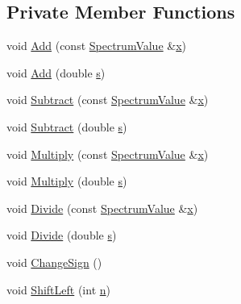 \subsection*{Private Member Functions}
\begin{DoxyCompactItemize}
\item 
void \hyperlink{classns3_1_1SpectrumValue_ae83185250a36c6f20ec48b81c6f37a8e}{Add} (const \hyperlink{classns3_1_1SpectrumValue}{Spectrum\+Value} \&\hyperlink{lte__link__budget__x2__handover__measures_8m_a9336ebf25087d91c818ee6e9ec29f8c1}{x})
\item 
void \hyperlink{classns3_1_1SpectrumValue_ac36e6799f96fe8fe49ffcc2446fa5e5a}{Add} (double \hyperlink{generate__test__data__lte__sinr_8m_ad83eeb3a142285d1243a08c6b7026df8}{s})
\item 
void \hyperlink{classns3_1_1SpectrumValue_a0b11c2d4e4ab5334c553c0ed629d4590}{Subtract} (const \hyperlink{classns3_1_1SpectrumValue}{Spectrum\+Value} \&\hyperlink{lte__link__budget__x2__handover__measures_8m_a9336ebf25087d91c818ee6e9ec29f8c1}{x})
\item 
void \hyperlink{classns3_1_1SpectrumValue_adb05d2e4648df697a996c62c9815e3b0}{Subtract} (double \hyperlink{generate__test__data__lte__sinr_8m_ad83eeb3a142285d1243a08c6b7026df8}{s})
\item 
void \hyperlink{classns3_1_1SpectrumValue_aeaebf121cc313007e18de77ec87cb1a1}{Multiply} (const \hyperlink{classns3_1_1SpectrumValue}{Spectrum\+Value} \&\hyperlink{lte__link__budget__x2__handover__measures_8m_a9336ebf25087d91c818ee6e9ec29f8c1}{x})
\item 
void \hyperlink{classns3_1_1SpectrumValue_a638d6a0199bff9ae1b03c7e14d55406f}{Multiply} (double \hyperlink{generate__test__data__lte__sinr_8m_ad83eeb3a142285d1243a08c6b7026df8}{s})
\item 
void \hyperlink{classns3_1_1SpectrumValue_a24cdc9928e58cfa9ec923e51ffa10c04}{Divide} (const \hyperlink{classns3_1_1SpectrumValue}{Spectrum\+Value} \&\hyperlink{lte__link__budget__x2__handover__measures_8m_a9336ebf25087d91c818ee6e9ec29f8c1}{x})
\item 
void \hyperlink{classns3_1_1SpectrumValue_a1666d148b323bdc0bddd059d9045366a}{Divide} (double \hyperlink{generate__test__data__lte__sinr_8m_ad83eeb3a142285d1243a08c6b7026df8}{s})
\item 
void \hyperlink{classns3_1_1SpectrumValue_a59e7392dde250dac4154352e7f488516}{Change\+Sign} ()
\item 
void \hyperlink{classns3_1_1SpectrumValue_a83a4aef689ac0002c73e057a42c0b254}{Shift\+Left} (int \hyperlink{lte__link__budget__x2__handover__measures_8m_abdb05bc5a064cf642a06c83b3392f148}{n})

\end{DoxyCompactItemize}
